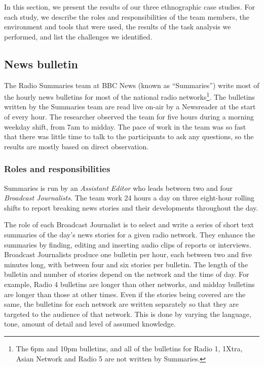 In this section, we present the results of our three ethnographic case studies. For each study, we describe the roles
and responsibilities of the team members, the environment and tools that were used, the results of the task analysis we
performed, and list the challenges we identified.


\subsection{News bulletin}\label{sec:news}
The Radio Summaries team at BBC News (known as ``Summaries'') write most of the hourly news bulletins for most of the
national radio networks\footnote{The 6pm and 10pm bulletins, and all of the bulletins for Radio 1, 1Xtra, Asian Network
and Radio 5 are not written by Summaries.}.  The bulletins written by the Summaries team are read live on-air by a
Newsreader at the start of every hour.  The researcher observed the team for five hours during a morning weekday shift,
from 7am to midday. The pace of work in the team was so fast that there was little time to talk to the participants to
ask any questions, so the results are mostly based on direct observation.

\subsubsection{Roles and responsibilities}\label{sec:news-roles}
Summaries is run by an \textit{Assistant Editor} who leads between two and four \textit{Broadcast Journalists}. The
team work 24 hours a day on three eight-hour rolling shifts to report breaking news stories and their developments
throughout the day.

The role of each Broadcast Journalist is to select and write a series of short text summaries of the day's news stories
for a given radio network.  They enhance the summaries by finding, editing and inserting audio clips of reports or
interviews.  Broadcast Journalists produce one bulletin per hour, each between two and five minutes long, with between
four and six stories per bulletin.  The length of the bulletin and number of stories depend on the network and the time
of day. For example, Radio 4 bulletins are longer than other networks, and midday bulletins are longer than those at
other times. Even if the stories being covered are the same, the bulletins for each network are written separately so
that they are targeted to the audience of that network.  This is done by varying the language, tone, amount of detail
and level of assumed knowledge.


